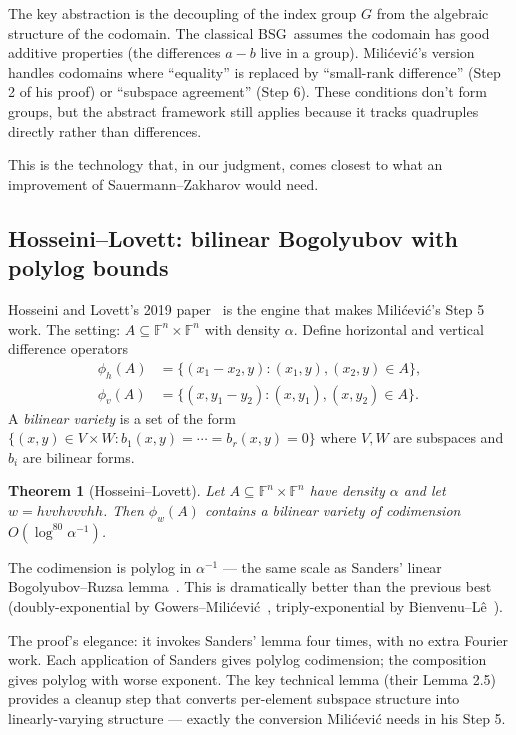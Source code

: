 \documentclass[11pt,a4paper]{article}
\theoremstyle{plain}
\newtheorem{theorem}{Theorem}[section]
\theoremstyle{definition}
\theoremstyle{remark}
\newcommand{\F}{\mathbb{F}}
\newcommand{\BSG}{\textsf{BSG}}
\begin{document}
The key abstraction is the decoupling of the index group $G$ from the algebraic structure of the codomain. The classical \BSG\ assumes the codomain has good additive properties (the differences $a - b$ live in a group). Milićević's version handles codomains where ``equality'' is replaced by ``small-rank difference'' (Step 2 of his proof) or ``subspace agreement'' (Step 6). These conditions don't form groups, but the abstract framework still applies because it tracks quadruples directly rather than differences.

This is the technology that, in our judgment, comes closest to what an improvement of Sauermann--Zakharov would need.

\subsection{Hosseini--Lovett: bilinear Bogolyubov with polylog bounds}

Hosseini and Lovett's 2019 paper~\cite{hosseinilovett2019} is the engine that makes Milićević's Step 5 work. The setting: $A \subseteq \F^n \times \F^n$ with density $\alpha$. Define horizontal and vertical difference operators
\begin{align*}
\phi_h(A) &= \{(x_1 - x_2, y) : (x_1, y), (x_2, y) \in A\}, \\
\phi_v(A) &= \{(x, y_1 - y_2) : (x, y_1), (x, y_2) \in A\}.
\end{align*}
A \emph{bilinear variety} is a set of the form $\{(x, y) \in V \times W : b_1(x, y) = \cdots = b_r(x, y) = 0\}$ where $V, W$ are subspaces and $b_i$ are bilinear forms.

\begin{theorem}[Hosseini--Lovett]
Let $A \subseteq \F^n \times \F^n$ have density $\alpha$ and let $w = hvvhvvvhh$. Then $\phi_w(A)$ contains a bilinear variety of codimension $O(\log^{80} \alpha^{-1})$.
\end{theorem}

The codimension is polylog in $\alpha^{-1}$ --- the same scale as Sanders' linear Bogolyubov--Ruzsa lemma~\cite{sanders2012}. This is dramatically better than the previous best (doubly-exponential by Gowers--Milićević~\cite{gowersmilicevic2017bilinear}, triply-exponential by Bienvenu--L\^e~\cite{bienvenule2017}).

The proof's elegance: it invokes Sanders' lemma four times, with no extra Fourier work. Each application of Sanders gives polylog codimension; the composition gives polylog with worse exponent. The key technical lemma (their Lemma 2.5) provides a cleanup step that converts per-element subspace structure into linearly-varying structure --- exactly the conversion Milićević needs in his Step 5.
\end{document}
